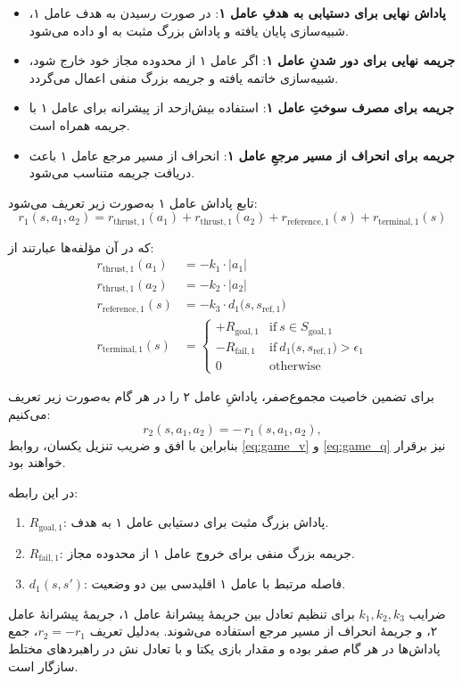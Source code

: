\begin{itemize}
	\begin{itemize}
		\item \textbf{پاداش نهایی برای دستیابی به هدفِ عامل ۱}: در صورت رسیدن به هدف عامل ۱، شبیه‌سازی پایان یافته و پاداش بزرگ مثبت به او داده می‌شود.
		\item \textbf{جریمه نهایی برای دور شدنِ عامل ۱}: اگر عامل ۱ از محدوده مجاز خود خارج شود، شبیه‌سازی خاتمه یافته و جریمه بزرگ منفی اعمال می‌گردد.
		\item \textbf{جریمه برای مصرف سوختِ عامل ۱}: استفاده بیش‌از‌حد از پیشرانه برای عامل ۱ با جریمه همراه است.
		\item \textbf{جریمه برای انحراف از مسیر مرجعِ عامل ۱}: انحراف از مسیر مرجع عامل ۱ باعث دریافت جریمه متناسب می‌شود.
	\end{itemize}
	
	تابع پاداش عامل ۱ به‌صورت زیر تعریف می‌شود:
	\[
	r_1(s, a_1, a_2) = r_{\text{thrust},1}(a_1) + r_{\text{thrust},1}(a_2) + r_{\text{reference},1}(s) + r_{\text{terminal},1}(s)
	\]
	
	که در آن مؤلفه‌ها عبارتند از:
	\begin{align}
		r_{\text{thrust},1}(a_1) &= -k_1 \cdot |a_1| \\
		r_{\text{thrust},1}(a_2) &= -k_2 \cdot |a_2| \\
		r_{\text{reference},1}(s) &= -k_3 \cdot d_1\!\big(s, s_{\text{ref},1}\big) \\
		r_{\text{terminal},1}(s) &=
		\begin{cases}
			+R_{\text{goal},1} & \text{if}~ s \in S_{\text{goal},1} \\
			-R_{\text{fail},1} & \text{if}~ d_1\!\big(s, s_{\text{ref},1}\big) > \epsilon_1 \\
			0 & \text{otherwise}
		\end{cases}
	\end{align}
	
	برای تضمین خاصیت مجموع‌صفر، پاداشِ عامل ۲ را در هر گام به‌صورت زیر تعریف می‌کنیم:
	\[
	r_2(s, a_1, a_2) = -\,r_1(s, a_1, a_2),
	\]
	بنابراین با افق و ضریب تنزیل یکسان، روابط \eqref{eq:game_v} و \eqref{eq:game_q} نیز برقرار خواهند بود.
	
	در این رابطه:
	\begin{enumerate}
		\item \(R_{\text{goal},1}\): پاداش بزرگ مثبت برای دستیابی عامل ۱ به هدف.
		\item \(R_{\text{fail},1}\): جریمه بزرگ منفی برای خروج عامل ۱ از محدوده مجاز.
		\item \(d_1(s, s')\): فاصله مرتبط با عامل ۱ اقلیدسی بین دو وضعیت.
	\end{enumerate}
	
	ضرایب \(k_1, k_2, k_3\) برای تنظیم تعادل بین جریمهٔ پیشرانهٔ عامل ۱، جریمهٔ پیشرانهٔ عامل ۲، و جریمهٔ انحراف از مسیر مرجع استفاده می‌شوند. به‌دلیل تعریف \(r_2=-r_1\)، جمع پاداش‌ها در هر گام صفر بوده و مقدار بازی یکتا و با تعادل نش در راهبردهای مختلط سازگار است.
	
	
	
\end{itemize}

